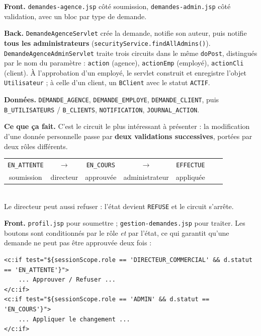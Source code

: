 \textbf{Front.} \texttt{demandes-agence.jsp} côté soumission,
\texttt{demandes-admin.jsp} côté validation, avec un bloc par type de demande.

\textbf{Back.} \texttt{DemandeAgenceServlet} crée la demande, notifie son
auteur, puis notifie \textbf{tous les administrateurs}
(\texttt{securityService.findAllAdmins()}). \texttt{DemandeAgenceAdminServlet}
traite trois circuits dans le même \texttt{doPost}, distingués par le nom du
paramètre : \texttt{action} (agence), \texttt{actionEmp} (employé),
\texttt{actionCli} (client). À l'approbation d'un employé, le servlet
construit et enregistre l'objet \texttt{Utilisateur} ; à celle d'un client, un
\texttt{BClient} avec le statut \texttt{ACTIF}.

\textbf{Données.} \texttt{DEMANDE\_AGENCE}, \texttt{DEMANDE\_EMPLOYE},
\texttt{DEMANDE\_CLIENT}, puis \texttt{B\_UTILISATEURS} / \texttt{B\_CLIENTS},
\texttt{NOTIFICATION}, \texttt{JOURNAL\_ACTION}.


\textbf{Ce que ça fait.} C'est le circuit le plus intéressant à présenter :
la modification d'une donnée personnelle passe par \textbf{deux validations
successives}, portées par deux rôles différents.

\begin{center}
\small
\begin{tabular}{ccccccc}
\colorbox{btkpale}{\texttt{EN\_ATTENTE}} & $\rightarrow$ &
\colorbox{btkpale}{\texttt{EN\_COURS}} & $\rightarrow$ &
\colorbox{btkpale}{\texttt{EFFECTUE}} \\[3pt]
\footnotesize soumission & \footnotesize directeur & \footnotesize approuvée &
\footnotesize administrateur & \footnotesize appliquée
\end{tabular}\\[6pt]
\footnotesize Le directeur peut aussi refuser : l'état devient \texttt{REFUSE} et le circuit s'arrête.
\end{center}

\textbf{Front.} \texttt{profil.jsp} pour soumettre ;
\texttt{gestion-demandes.jsp} pour traiter. Les boutons sont conditionnés par
le rôle \emph{et} par l'état, ce qui garantit qu'une demande ne peut pas être
approuvée deux fois :

\begin{lstlisting}[style=jsp]
<c:if test="${sessionScope.role == 'DIRECTEUR_COMMERCIAL' && d.statut == 'EN_ATTENTE'}">
    ... Approuver / Refuser ...
</c:if>
<c:if test="${sessionScope.role == 'ADMIN' && d.statut == 'EN_COURS'}">
    ... Appliquer le changement ...
</c:if>
\end{lstlisting}

